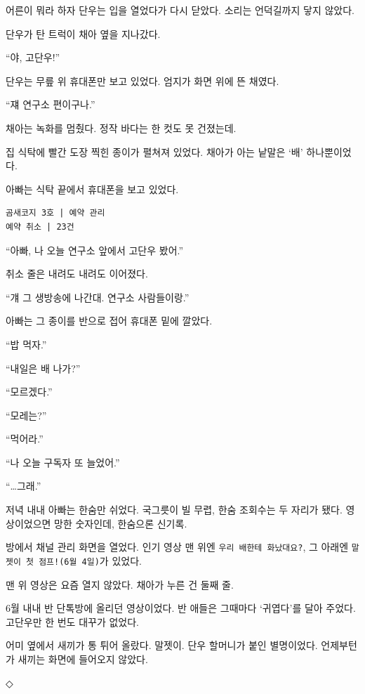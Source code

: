 \documentclass[
  korean,
  letterpaper,
  twoside,
  open=any,
  fontsize=12.5pt,
  headings=small]{scrbook}
\newcommand{\logfont}{\linespread{1}\fontsize{10.8}{15.2}\selectfont}
\begin{document}
어른이 뭐라 하자 단우는 입을
열었다가 다시 닫았다. 소리는
언덕길까지 닿지 않았다.

단우가 탄 트럭이 채아 옆을
지나갔다.

``야, 고단우!''

단우는 무릎 위 휴대폰만 보고
있었다. 엄지가 화면 위에 뜬
채였다.

``쟤 연구소 편이구나.''

채아는 녹화를 멈췄다. 정작
바다는 한 컷도 못 건졌는데.

집 식탁에 빨간 도장 찍힌
종이가 펼쳐져 있었다. 채아가
아는 낱말은 `배' 하나뿐이었다.

아빠는 식탁 끝에서 휴대폰을
보고 있었다.

\begin{Verbatim}[samepage=true,frame=single,framesep=2.5mm,rulecolor=\color{gray},formatcom=\logfont]
곰새코지 3호 | 예약 관리
예약 취소 | 23건
\end{Verbatim}

``아빠, 나 오늘 연구소 앞에서
고단우 봤어.''

취소 줄은 내려도 내려도
이어졌다.

``걔 그 생방송에 나간대.
연구소 사람들이랑.''

아빠는 그 종이를 반으로 접어
휴대폰 밑에 깔았다.

``밥 먹자.''

``내일은 배 나가?''

``모르겠다.''

``모레는?''

``먹어라.''

``나 오늘 구독자 또 늘었어.''

``\ldots 그래.''

저녁 내내 아빠는 한숨만
쉬었다. 국그릇이 빌 무렵, 한숨
조회수는 두 자리가 됐다.
영상이었으면 망한 숫자인데,
한숨으론 신기록.

방에서 채널 관리 화면을
열었다. 인기 영상 맨 위엔
\texttt{우리\ 배한테\ 화났대요?},
그 아래엔
\texttt{말젯이\ 첫\ 점프!(6월\ 4일)}가
있었다.

맨 위 영상은 요즘 열지 않았다.
채아가 누른 건 둘째 줄.

6월 내내 반 단톡방에 올리던
영상이었다. 반 애들은 그때마다
`귀엽다'를 달아 주었다.
고단우만 한 번도 대꾸가
없었다.

어미 옆에서 새끼가 통 튀어
올랐다. 말젯이. 단우 할머니가
붙인 별명이었다. 언제부턴가
새끼는 화면에 들어오지 않았다.

\begin{center}◇\end{center}\nopagebreak
\end{document}
